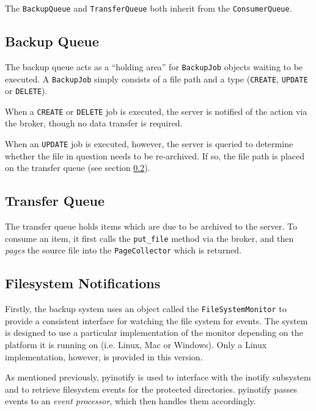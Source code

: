 The \verb!BackupQueue! and \verb!TransferQueue! both inherit from the
\verb!ConsumerQueue!.

\subsection{Backup Queue}
\label{sec:implementation-client-backupqueue}

The backup queue acts as a ``holding area'' for \verb!BackupJob! objects
waiting to be executed. A \verb!BackupJob! simply consists of a file path and
a type (\verb!CREATE!, \verb!UPDATE! or \verb!DELETE!).

When a \verb!CREATE! or \verb!DELETE! job is executed, the server is notified
of the action via the broker, though no data transfer is required.

When an \verb!UPDATE! job is executed, however, the server is queried to
determine whether the file in question needs to be re-archived. If so, the file
path is placed on the transfer queue (see section
\ref{sec:implementation-client-transferqueue}).

\subsection{Transfer Queue}
\label{sec:implementation-client-transferqueue}

The transfer queue holds items which are due to be archived to the server. To
consume an item, it first calls the \verb!put_file! method via the broker, and
then \emph{pages} the source file into the \verb!PageCollector! which is
returned.

\subsection{Filesystem Notifications}
\label{sec:implementation-client-fsnotify}

Firstly, the backup system uses an object called the \verb!FileSystemMonitor!
to provide a consistent interface for watching the file system for events. The
system is designed to use a particular implementation of the monitor depending
on the platform it is running on (i.e. Linux, Mac or Windows). Only a Linux
implementation, however, is provided in this version.

As mentioned previously, pyinotify is used to interface with the inotify
subsystem and to retrieve filesystem events for the protected directories.
pyinotify passes events to an \emph{event processor}, which then handles them
accordingly.


